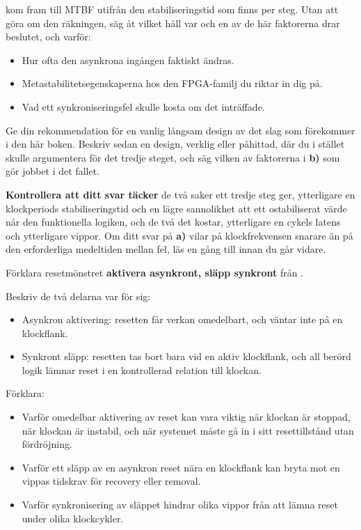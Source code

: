   kom fram till MTBF utifrån den stabiliseringstid som finns per steg.
Utan att göra om den räkningen, säg åt vilket håll var och en av de här faktorerna drar beslutet,
och varför:
\begin{itemize}
  \item Hur ofta den asynkrona ingången faktiskt ändras.
  \item Metastabilitetsegenskaperna hos den FPGA-familj du riktar in dig på.
  \item Vad ett synkroniseringsfel skulle kosta om det inträffade.
\end{itemize}

 Ge din rekommendation för en vanlig långsam design av det slag som förekommer i den här
boken. Beskriv sedan en design, verklig eller påhittad, där du i stället skulle argumentera för det
tredje steget, och säg vilken av faktorerna i \textbf{b)} som gör jobbet i det fallet.

\begin{aside}
\textbf{Kontrollera att ditt svar täcker} de två saker ett tredje steg ger, ytterligare en
klockperiods stabiliseringstid och en lägre sannolikhet att ett ostabiliserat värde når den
funktionella logiken, och de två det kostar, ytterligare en cykels latens och ytterligare vippor.
Om ditt svar på \textbf{a)} vilar på klockfrekvensen snarare än på den erforderliga medeltiden
mellan fel, läs  en gång till innan du går vidare.
\end{aside}

\label{c4:ex:resetpattern}
Förklara resetmönstret \textbf{aktivera asynkront, släpp synkront} från .

Beskriv de två delarna var för sig:
\begin{itemize}
  \item Asynkron aktivering: resetten får verkan omedelbart, och väntar inte på en klockflank.
  \item Synkront släpp: resetten tas bort bara vid en aktiv klockflank, och all berörd logik lämnar
    reset i en kontrollerad relation till klockan.
\end{itemize}

Förklara:
\begin{itemize}
  \item Varför omedelbar aktivering av reset kan vara viktig när klockan är stoppad, när klockan är
    instabil, och när systemet måste gå in i sitt resettillstånd utan fördröjning.
  \item Varför ett släpp av en asynkron reset nära en klockflank kan bryta mot en vippas tidskrav
    för recovery eller removal.
  \item Varför synkronisering av släppet hindrar olika vippor från att lämna reset under olika
    klockcykler.
\end{itemize}

